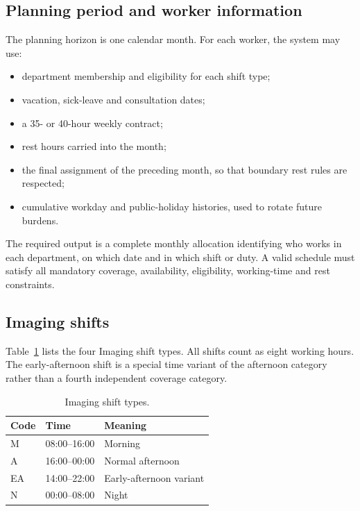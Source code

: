\documentclass[11pt,a4paper]{article}
\begin{document}
\subsection{Planning period and worker information}

The planning horizon is one calendar month. For each worker, the system may use:

\begin{itemize}
  \item department membership and eligibility for each shift type;
  \item vacation, sick-leave and consultation dates;
  \item a 35- or 40-hour weekly contract;
  \item rest hours carried into the month;
  \item the final assignment of the preceding month, so that boundary rest rules are respected;
  \item cumulative workday and public-holiday histories, used to rotate future burdens.
\end{itemize}

The required output is a complete monthly allocation identifying who works in each department, on which date and in which shift or duty. A valid schedule must satisfy all mandatory coverage, availability, eligibility, working-time and rest constraints.

\subsection{Imaging shifts}

Table~\ref{tab:problem-shifts} lists the four Imaging shift types. All shifts count as eight working hours. The early-afternoon shift is a special time variant of the afternoon category rather than a fourth independent coverage category.

\begin{table}[H]
\centering
\caption{Imaging shift types.}
\label{tab:problem-shifts}
\begin{tabular}{lll}
\toprule
Code & Time & Meaning \\
\midrule
M & 08:00--16:00 & Morning \\
A & 16:00--00:00 & Normal afternoon \\
EA & 14:00--22:00 & Early-afternoon variant \\
N & 00:00--08:00 & Night \\
\bottomrule
\end{tabular}
\end{table}
\end{document}
